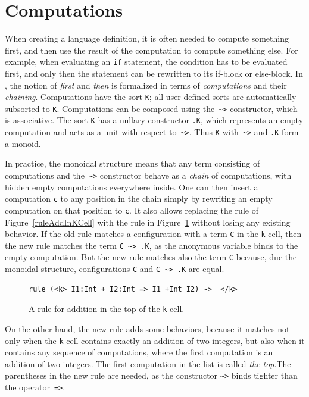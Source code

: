 \documentclass[nolot,nolof,nocover,printed]{fithesis3}
\begin{document}
\section{Computations}
When creating a language definition, it is often needed to compute something first, and then use the result of the computation to compute something else. For example, when evaluating an \lstinline|if| statement, the condition has to be evaluated first, and only then the statement can be rewritten to its if-block or else-block. In \K, the notion of \textit{first} and \textit{then} is formalized in terms of \textit{computations} and their \textit{chaining}. Computations have the sort \texttt{K}; all user-defined sorts are automatically subsorted to \texttt{K}. Computations can be composed using the~\lstinline|~>| constructor, which is associative. The sort \texttt{K} has a nullary constructor \texttt{.K}, which represents an empty computation and acts as a unit with respect to~\lstinline|~>|. Thus \texttt{K} with~\lstinline|~>| and \texttt{.K} form a monoid.

In practice, the monoidal structure means that any term consisting of computations and the~\lstinline|~>| constructor behave as a \textit{chain} of computations, with hidden empty computations everywhere inside. One can then insert a computation \texttt{c} to any position in the chain simply by rewriting an empty computation on that position to \texttt{c}. It also allows replacing the rule of Figure~\ref{ruleAddInKCell} with the rule in Figure~\ref{fig:ruleAddInTopOfKCell} without losing any existing behavior. If the old rule matches a configuration with a term \lstinline|C| in the \texttt{k} cell, then the new rule matches the term \lstinline|C ~> .K|, as the anonymous variable binds to the empty computation. But the new rule matches also the term \lstinline|C| because, due the monoidal structure, configurations \lstinline|C| and \lstinline|C ~> .K| are equal.

\begin{figure}[ht]
\begin{lstlisting}
rule (<k> I1:Int + I2:Int => I1 +Int I2) ~> _</k>
\end{lstlisting}
\caption{A rule for addition in the top of the \texttt{k} cell.}
\label{fig:ruleAddInTopOfKCell}
\end{figure}

On the other hand, the new rule adds some behaviors, because it matches not only when the \texttt{k} cell contains exactly an addition of two integers, but also when it contains any sequence of computations, where the first computation is an addition of two integers. The first computation in the list is called \textit{the top}.The parentheses in the new rule are needed, as the constructor \lstinline|~>| binds tighter than the operator~\lstinline|=>|.
\end{document}
